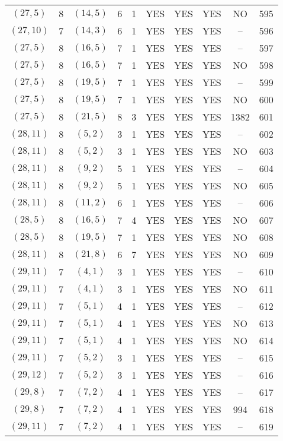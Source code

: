 \begin{longtable}{|c|c|c|c|c|c|c|c|c|c|}
$(27, 5)$ & 8 & $(14, 5)$ & 6 & 1 & YES & YES & YES & NO & 595\\
$(27, 10)$ & 7 & $(14, 3)$ & 6 & 1 & YES & YES & YES & -- & 596\\
$(27, 5)$ & 8 & $(16, 5)$ & 7 & 1 & YES & YES & YES & -- & 597\\
$(27, 5)$ & 8 & $(16, 5)$ & 7 & 1 & YES & YES & YES & NO & 598\\
$(27, 5)$ & 8 & $(19, 5)$ & 7 & 1 & YES & YES & YES & -- & 599\\
$(27, 5)$ & 8 & $(19, 5)$ & 7 & 1 & YES & YES & YES & NO & 600\\
$(27, 5)$ & 8 & $(21, 5)$ & 8 & 3 & YES & YES & YES & 1382 & 601\\
$(28, 11)$ & 8 & $(5, 2)$ & 3 & 1 & YES & YES & YES & -- & 602\\
$(28, 11)$ & 8 & $(5, 2)$ & 3 & 1 & YES & YES & YES & NO & 603\\
$(28, 11)$ & 8 & $(9, 2)$ & 5 & 1 & YES & YES & YES & -- & 604\\
$(28, 11)$ & 8 & $(9, 2)$ & 5 & 1 & YES & YES & YES & NO & 605\\
$(28, 11)$ & 8 & $(11, 2)$ & 6 & 1 & YES & YES & YES & -- & 606\\
$(28, 5)$ & 8 & $(16, 5)$ & 7 & 4 & YES & YES & YES & NO & 607\\
$(28, 5)$ & 8 & $(19, 5)$ & 7 & 1 & YES & YES & YES & NO & 608\\
$(28, 11)$ & 8 & $(21, 8)$ & 6 & 7 & YES & YES & YES & NO & 609\\
$(29, 11)$ & 7 & $(4, 1)$ & 3 & 1 & YES & YES & YES & -- & 610\\
$(29, 11)$ & 7 & $(4, 1)$ & 3 & 1 & YES & YES & YES & NO & 611\\
$(29, 11)$ & 7 & $(5, 1)$ & 4 & 1 & YES & YES & YES & -- & 612\\
$(29, 11)$ & 7 & $(5, 1)$ & 4 & 1 & YES & YES & YES & NO & 613\\
$(29, 11)$ & 7 & $(5, 1)$ & 4 & 1 & YES & YES & YES & NO & 614\\
$(29, 11)$ & 7 & $(5, 2)$ & 3 & 1 & YES & YES & YES & -- & 615\\
$(29, 12)$ & 7 & $(5, 2)$ & 3 & 1 & YES & YES & YES & -- & 616\\
$(29, 8)$ & 7 & $(7, 2)$ & 4 & 1 & YES & YES & YES & -- & 617\\
$(29, 8)$ & 7 & $(7, 2)$ & 4 & 1 & YES & YES & YES & 994 & 618\\
$(29, 11)$ & 7 & $(7, 2)$ & 4 & 1 & YES & YES & YES & -- & 619\\

\end{longtable}

